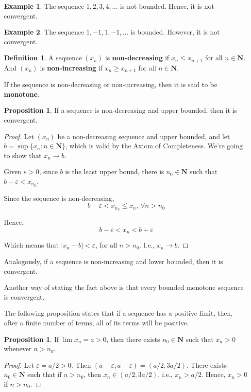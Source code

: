 \documentclass[12pt,a4paper]{article}
\theoremstyle{definition}
\newtheorem{proposition}[theorem]{Proposition}
\newtheorem{example}{Example}[section]
\newtheorem{definition}{Definition}[section]
\begin{document}
\begin{example}
	The sequence $1,2,3,4,\ldots$ is not bounded. Hence, it is not convergent.
\end{example}

\begin{example}
	The sequence $1,-1,1,-1, \ldots$ is bounded. However, it is not convergent.
\end{example}

\begin{definition}
	A sequence $(x_n)$ is \textbf{non-decreasing} if $x_n \leq x_{n+1}$ for all $n \in \textbf{N}$. And $(x_n)$ is \textbf{non-increasing} if $x_n \geq x_{n+1}$ for all $n \in \textbf{N}$.
	
	If the sequence is non-decreasing or non-increasing, then it is said to be \textbf{monotone}.
\end{definition}

\begin{proposition}
	If a sequence is non-decreasing and upper bounded, then it is convergent. 
\end{proposition}

\begin{proof}
	Let $(x_n)$ be a non-decreasing sequence and upper bounded, and let $b = \sup\{ x_n : n \in \textbf{N} \}$, which is valid by the Axiom of Completeness. We're going to show that $x_n \longrightarrow b$.
	
	Given $\varepsilon > 0$, since $b$ is the least upper bound, there is $n_0 \in \textbf{N}$ such that $b - \varepsilon < x_{n_0}$.
	
	Since the sequence is non-decreasing,
	\[ b - \varepsilon < x_{n_0} \leq x_n, \, \forall n > n_0 \]
	
	Hence,
	\[ b - \varepsilon < x_n < b + \varepsilon \]
	
	Which means that $|x_n - b| < \varepsilon$, for all $n > n_0$. I.e., $x_n \longrightarrow b$.
\end{proof}

Analogously, if a sequence is non-increasing and lower bounded, then it is convergent.

Another way of stating the fact above is that every bounded monotone sequence is convergent.

The following proposition states that if a sequence has a positive limit, then, after a finite number of terms, all of its terms will be positive.

\begin{proposition}
	If $\lim x_n = a > 0$, then there exists $n_0 \in \textbf{N}$ such that $x_n > 0$ whenever $n > n_0$.
\end{proposition}
\begin{proof}
	Let $\varepsilon = a/2 > 0$. Then $(a-\varepsilon, a+\varepsilon) = (a/2, 3a/2)$. There exists $n_0 \in \textbf{N}$ such that if $n > n_0$, then $x_n \in (a/2, 3a/2)$, i.e., $x_n > a/2$. Hence, $x_n > 0$ if $n > n_0$.
\end{proof}
\end{document}
